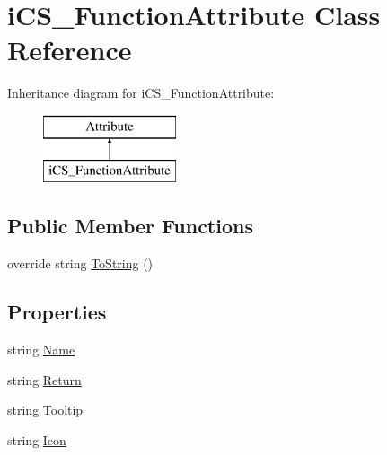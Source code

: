 \hypertarget{classi_c_s___function_attribute}{\section{i\+C\+S\+\_\+\+Function\+Attribute Class Reference}
\label{classi_c_s___function_attribute}
}
Inheritance diagram for i\+C\+S\+\_\+\+Function\+Attribute\+:\begin{figure}[H]
\begin{center}
\leavevmode
\includegraphics[height=2.000000cm]{classi_c_s___function_attribute}
\end{center}
\end{figure}
\subsection*{Public Member Functions}
\begin{DoxyCompactItemize}
\item 
override string \hyperlink{classi_c_s___function_attribute_a8d5e46ee8536c19909464c85af4dcd50}{To\+String} ()
\end{DoxyCompactItemize}
\subsection*{Properties}
\begin{DoxyCompactItemize}
\item 
string \hyperlink{classi_c_s___function_attribute_a2a4f0d0b295552f352c195b8b982b11f}{Name}
\item 
string \hyperlink{classi_c_s___function_attribute_aa1b602631e8160d609345a7bf0b3218a}{Return}
\item 
string \hyperlink{classi_c_s___function_attribute_a2fb44497a84434daa682de0deb64378d}{Tooltip}
\item 
string \hyperlink{classi_c_s___function_attribute_a44842b03adcb4320f78608760fbe869d}{Icon}
\end{DoxyCompactItemize}



